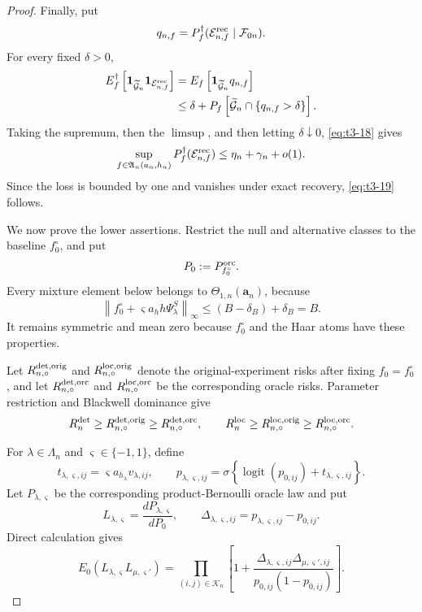 \documentclass[11pt]{article}
\theoremstyle{definition}
\newcommand{\1}{\mathbf 1}\newcommand{\op}{\operatorname}
\begin{document}
\begin{proof}
Finally, put
\[
q_{n,f}
=
P_f^\dagger
(\mathcal E_{n,f}^{\rm rec}\mid\mathcal F_{0n}).
\]
For every fixed \(\delta>0\),
\begin{align*}
E_f^\dagger
\left[
\mathbf 1_{\widetilde{\mathcal G}_n}
\mathbf 1_{\mathcal E_{n,f}^{\rm rec}}
\right]
&=
E_f\left[
\mathbf 1_{\widetilde{\mathcal G}_n}q_{n,f}
\right]\\
&\le
\delta
+
P_f\left[
\widetilde{\mathcal G}_n
\cap
\{q_{n,f}>\delta\}
\right].
\end{align*}
Taking the supremum, then the \(\limsup\), and then letting
\(\delta\downarrow0\), \eqref{eq:t3-18} gives
\[
\sup_{f\in\mathfrak A_n(a_n,h_n)}
P_f^\dagger(\mathcal E_{n,f}^{\rm rec})
\le
\eta_n+\gamma_n+o(1).
\]
Since the loss is bounded by one and vanishes under exact recovery,
\eqref{eq:t3-19} follows.

We now prove the lower assertions.  Restrict the null and alternative
classes to the baseline \(f_0^\circ\), and put
\[
P_0:=P_{f_0^\circ}^{\rm orc}.
\]
Every mixture element below belongs to
\(\Theta_{1,n}(\mathbf a_n)\), because
\[
\left\|
f_0^\circ+\varsigma a_h h\Psi_\lambda^S
\right\|_\infty
\le
(B-\delta_B)+\delta_B
=
B.
\]
It remains symmetric and mean zero because \(f_0^\circ\) and the Haar
atoms have these properties.

Let \(R_{n,\circ}^{\rm det,orig}\) and
\(R_{n,\circ}^{\rm loc,orig}\) denote the original-experiment risks
after fixing \(f_0=f_0^\circ\), and let
\(R_{n,\circ}^{\rm det,orc}\) and
\(R_{n,\circ}^{\rm loc,orc}\) be the corresponding oracle risks.
Parameter restriction and Blackwell dominance give
\[
R_n^{\rm det}
\ge
R_{n,\circ}^{\rm det,orig}
\ge
R_{n,\circ}^{\rm det,orc},
\qquad
R_n^{\rm loc}
\ge
R_{n,\circ}^{\rm loc,orig}
\ge
R_{n,\circ}^{\rm loc,orc}.
\]

For \(\lambda\in\Lambda_n\) and
\(\varsigma\in\{-1,1\}\), define
\[
t_{\lambda,\varsigma,ij}
=
\varsigma a_{h_\lambda}v_{\lambda,ij},
\qquad
p_{\lambda,\varsigma,ij}
=
\sigma\left\{
\operatorname{logit}(p_{0,ij})
+
t_{\lambda,\varsigma,ij}
\right\}.
\]
Let \(P_{\lambda,\varsigma}\) be the corresponding product-Bernoulli
oracle law and put
\[
L_{\lambda,\varsigma}
=
\frac{dP_{\lambda,\varsigma}}{dP_0},
\qquad
\Delta_{\lambda,\varsigma,ij}
=
p_{\lambda,\varsigma,ij}-p_{0,ij}.
\]
Direct calculation gives
\begin{equation}
E_0
(L_{\lambda,\varsigma}L_{\mu,\varsigma'})
=
\prod_{(i,j)\in\mathcal K_n}
\left[
1+
\frac{
\Delta_{\lambda,\varsigma,ij}
\Delta_{\mu,\varsigma',ij}
}{
p_{0,ij}(1-p_{0,ij})
}
\right].
\label{eq:t3-37}
\end{equation}


\end{proof}
\end{document}
